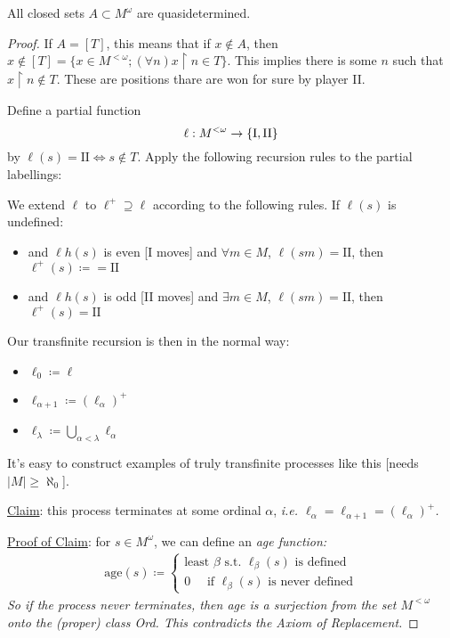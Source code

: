 \documentclass[]{article}
\newcommand{\I}{\textrm{I}}
\newcommand{\II}{\textrm{II}}
\newcommand{\om}{\omega}
\newcommand{\lom}{{<\omega}}
\newcommand{\lh}{\ell h}
\begin{document}
\begin{theorem*}
    All closed sets $A\subset M^\om$ are quasidetermined.
\end{theorem*}
\begin{proof}
    If $A = [T]$, this means that if $x\not \in A$, then $x\not\in [T] = \{x\in M^\lom; (\forall n)x\restriction n\in T\}$. This implies there is some $n$ such that $x\restriction n\not \in T$. These are positions thare are won for sure by player II.

    Define a partial function $$\ell:M^\lom \ra \{\I,\II\}$$ by $\ell(s) = \II\iff s\not\in T$. Apply the following recursion rules to the partial labellings:

    We extend $\ell$ to $\ell^+\supseteq \ell$ according to the following rules. If $\ell(s)$ is undefined:
    \begin{itemize}
        \item and $\lh(s)$ is even [I moves] and $\forall m\in M$, $\ell(sm)=\II$, then $\ell^+(s)\coloneqq = \II$
        \item and $\lh(s)$ is odd [II moves] and $\exists m\in M$, $\ell(sm) = \II$, then $\ell^+(s) = \II$
    \end{itemize}
    Our transfinite recursion is then in the normal way:
    \begin{itemize}
        \item $\ell_0\coloneqq \ell$
        \item $\ell_{\alpha+1} \coloneqq (\ell_\alpha)^+$
        \item $\ell_{\lambda} \coloneqq \bigcup_{\alpha < \lambda} \ell_\alpha$
    \end{itemize}
    It's easy to construct examples of truly transfinite processes like this [needs $|M|\ge \aleph_0$].

    \underline{Claim}: this process terminates at some ordinal $\alpha$, \it{i.e.} $\ell_{\alpha} = \ell_{\alpha+1} = (\ell_{\alpha})^+$.

    \underline{Proof of Claim}: for $s\in M^\om$, we can define an \it{age function}:
    \begin{align*}
        \textrm{age}(s)\coloneqq \left\lbrace \begin{array}{c}\textrm{least }\beta\textrm{ s.t. }\ell_{\beta}(s)\textrm{ is defined}\\ 0\quad\textrm{ if }\ell_{\beta}(s)\textrm{ is never defined}\end{array}\right.
    \end{align*}
    So if the process never terminates, then age is a surjection from the set $M^\lom$ onto the (proper) class Ord. This contradicts the Axiom of Replacement.


\end{proof}
\end{document}
